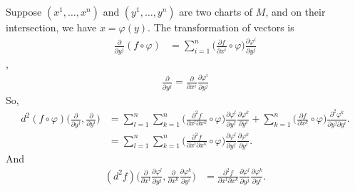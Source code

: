 Suppose $(x^1,\dots,x^n)$ and $(y^1,\dots,y^n)$ are two charts of $M$,
and on their intersection, we have $x=\varphi(y)$.
The transformation of vectors is
\begin{align}
    \frac{\partial}{\partial y^j} (f\circ \varphi)
        &= \sum_{i=1}^n \bigg(\frac{\partial f}{\partial x^i}\circ\varphi\bigg) \frac{\partial \varphi^i}{\partial y^j}
\end{align}
\ie,
\begin{align}
    \frac{\partial}{\partial y^j} = \frac{\partial}{\partial x^i}\frac{\partial\varphi^i}{\partial y^j}
\end{align}
So,
\begin{align}
    d^2 (f\circ\varphi)\bigg(\frac{\partial}{\partial y^j},\frac{\partial}{\partial y^i}\bigg)
    &= \sum_{l=1}^n\sum_{k=1}^n \bigg(\frac{\partial^2 f}{\partial x^l\partial x^k}\circ\varphi\bigg)\frac{\partial \varphi^l}{\partial y^j}\frac{\partial \varphi^k}{\partial y^i}
        + \sum_{k=1}^n \bigg(\frac{\partial f}{\partial x^k}\circ\varphi\bigg)\frac{\partial^2 \varphi^k}{\partial y^j\partial y^i}. \\
    &= \sum_{l=1}^n\sum_{k=1}^n \bigg(\frac{\partial^2 f}{\partial x^l\partial x^k}\circ\varphi\bigg)\frac{\partial \varphi^l}{\partial y^j}\frac{\partial \varphi^k}{\partial y^i}.
\end{align}
And
\begin{align}
    (d^2 f)\bigg(\frac{\partial}{\partial x^l}\frac{\partial \varphi^l}{\partial y^j},
        \frac{\partial}{\partial x^k}\frac{\partial \varphi^k}{\partial y^i}\bigg)
    &= \frac{\partial^2 f}{\partial x^l\partial x^k}\frac{\partial \varphi^l}{\partial y^j}\frac{\partial \varphi^k}{\partial y^i}.
\end{align}
